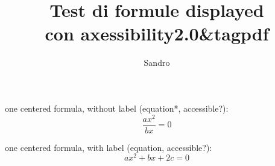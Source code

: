 \documentclass{article}
\title{Test di formule displayed\\con axessibility2.0\&tagpdf}
\author{Sandro}
\date{}
\begin{document}
\pagestyle{empty}




\maketitle


one centered formula, without label (equation*, accessible?):
\begin{equation*}
\frac{a x^2}{b x} = 0
\end{equation*}

one centered formula, with label (equation, accessible?):
\begin{equation}
a x^2 + b x + 2 c = 0
\end{equation}

\tagstructend
\end{document}
